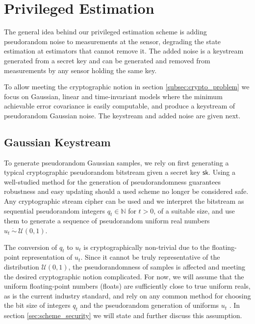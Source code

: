 \documentclass[letterpaper, 10 pt, conference]{IEEEtran}
\theoremstyle{definition}
\begin{document}
\section{Privileged Estimation}\label{sec:priv_estimation}
The general idea behind our privileged estimation scheme is adding pseudorandom noise to measurements at the sensor, degrading the state estimation at estimators that cannot remove it. The added noise is a keystream generated from a secret key and can be generated and removed from measurements by any sensor holding the same key.

To allow meeting the cryptographic notion in section \ref{subsec:crypto_problem} we focus on Gaussian, linear and time-invariant models where the minimum achievable error covariance is easily computable, and produce a keystream of pseudorandom Gaussian noise. The keystream and added noise are given next.

% 
% 

\subsection{Gaussian Keystream}\label{subsec:gaussian_keystream}
To generate pseudorandom Gaussian samples, we rely on first generating a typical cryptographic pseudorandom bitstream given a secret key $\mathsf{sk}$. Using a well-studied method for the generation of pseudorandomness guarantees robustness and easy updating should a used scheme no longer be considered safe. Any cryptographic stream cipher can be used and we interpret the bitstream as sequential pseudorandom integers $q_t \in \mathbb{N}$ for $t>0$, of a suitable size, and use them to generate a sequence of pseudorandom uniform real numbers $u_t\ \dot{\sim}\ \mathcal{U}(0,1)$.

The conversion of $q_t$ to $u_t$ is cryptographically non-trivial due to the floating-point representation of $u_t$. Since it cannot be truly representative of the distribution $\mathcal{U}(0,1)$, the pseudorandomness of samples is affected and meeting the desired cryptographic notion complicated. For now, we will assume that the uniform floating-point numbers (floats) are sufficiently close to true uniform reals, as is the current industry standard, and rely on any common method for choosing the bit size of integers $q_t$ and the pseudorandom generation of uniforms $u_t$ \cite{goualardGeneratingRandomFloatingPoint2020}. In section \ref{sec:scheme_security} we will state and further discuss this assumption.
\end{document}
